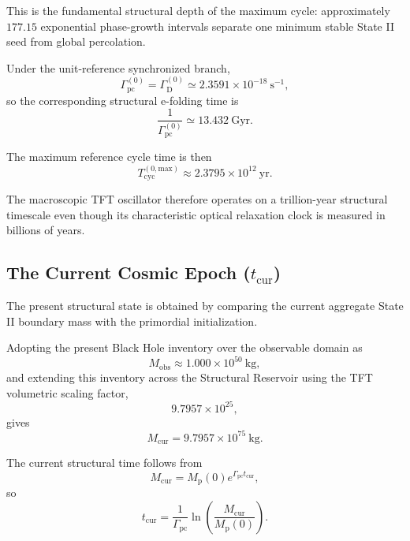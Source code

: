 This is the fundamental structural depth of the maximum cycle: approximately $177.15$ exponential phase-growth intervals separate one minimum stable State II seed from global percolation.

Under the unit-reference synchronized branch,
\begin{equation}
    \Gamma_{\mathrm{pc}}^{(0)}
    =
    \Gamma_{\mathrm D}^{(0)}
    \simeq
    2.3591\times10^{-18}\ \mathrm{s^{-1}},
\end{equation}
so the corresponding structural e-folding time is
\begin{equation}
    \frac{1}{\Gamma_{\mathrm{pc}}^{(0)}}
    \simeq
    13.432\ \mathrm{Gyr}.
\end{equation}

The maximum reference cycle time is then
\begin{equation}
    T_{\mathrm{cyc}}^{(0,\mathrm{max})}
    \approx
    2.3795\times10^{12}\ \mathrm{yr}.
\end{equation}

The macroscopic TFT oscillator therefore operates on a trillion-year structural timescale even though its characteristic optical relaxation clock is measured in billions of years.


\subsection{The Current Cosmic Epoch ($t_{\mathrm{cur}}$)}
\label{sec:current_cosmic_epoch}

The present structural state is obtained by comparing the current aggregate State II boundary mass with the primordial initialization.

Adopting the present Black Hole inventory over the observable domain as
\begin{equation}
    M_{\mathrm{obs}}
    \approx
    1.000\times10^{50}\ \mathrm{kg},
\end{equation}
and extending this inventory across the Structural Reservoir using the TFT volumetric scaling factor,
\begin{equation}
    9.7957\times10^{25},
\end{equation}
gives
\begin{equation}
    M_{\mathrm{cur}}
    =
    9.7957\times10^{75}\ \mathrm{kg}.
\end{equation}

The current structural time follows from
\begin{equation}
    M_{\mathrm{cur}}
    =
    M_{\mathrm p}(0)
    e^{\Gamma_{\mathrm{pc}}t_{\mathrm{cur}}},
\end{equation}
so
\begin{equation}
    t_{\mathrm{cur}}
    =
    \frac{1}{\Gamma_{\mathrm{pc}}}
    \ln\left(
        \frac{M_{\mathrm{cur}}}
        {M_{\mathrm p}(0)}
    \right).
\end{equation}

